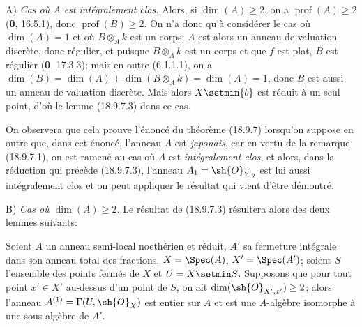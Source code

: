 A) \emph{Cas où $A$ est intégralement clos.} Alors, si $\dim(A)\geq 2$, on a $\operatorname{prof}(A)\geq 2$ (\textbf{0}, 16.5.1), donc $\operatorname{prof}(B)\geq 2$. On n'a donc qu'à considérer le cas où $\dim(A)=1$ et où $B\otimes_A k$ est un corps; $A$ est alors un anneau de valuation discrète, donc régulier, et puisque $B\otimes_A k$
est un corps et que $f$ est plat, $B$ est régulier (\textbf{0}, 17.3.3); mais en outre (6.1.1.1), on a $\dim(B)=\dim(A)+\dim(B\otimes_A k)=\dim(A)=1$, donc $B$ est aussi un anneau de valuation discrète. Mais alors $X\setmin\{b\}$ est réduit à un seul point, d'où le lemme (18.9.7.3) dans ce cas.

On observera que cela prouve l'énoncé du théorème (18.9.7) lorsqu'on suppose en outre que, dans cet énoncé, l'anneau $A$ est \emph{japonais}, car en vertu de la remarque (18.9.7.1), on est ramené au cas où $A$ est \emph{intégralement clos}, et alors, dans la réduction qui précède (18.9.7.3), l'anneau $A_1=\sh{O}_{Y,y}$ est lui aussi intégralement clos et on peut appliquer le résultat qui vient d'être démontré.

B) \emph{Cas où $\dim(A)\geq 2$.} Le résultat de (18.9.7.3) résultera alors des deux lemmes suivants:

\begin{lemma}[18.9.7.5]
\label{IV.18.9.7.5}
Soient $A$ un anneau semi-local noethérien et réduit, $A'$ sa fermeture intégrale dans son anneau total des fractions, $X=\Spec(A)$, $X'=\Spec(A')$; soient $S$ l'ensemble des points fermés de $X$ et $U=X\setmin S$. Supposons que pour tout point $x'\in X'$ au-dessus d'un point de $S$, on ait $\dim(\sh{O}_{X',x'})\geq 2$; alors l'anneau $A^{(1)}=\Gamma(U,\sh{O}_X)$ est entier sur $A$ et est une $A$-algèbre isomorphe à une sous-algèbre de $A'$.
\end{lemma}

